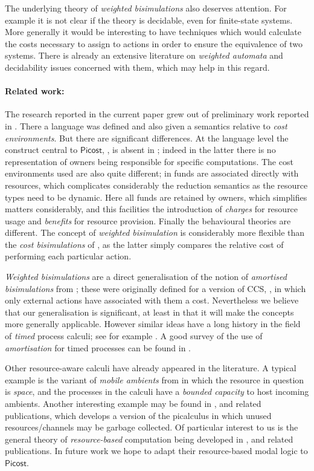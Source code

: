 \documentclass{LMCS}
\newcommand{\pfn}[1]{\mathsf{#1}}  \newcommand{\cfn}[1]{\mathsf{#1}}  \newcommand{\ownfnt}[1]{{\mathsf{#1}}}
\newcommand{\picost}{\ensuremath{\pfn{Picost}}\xspace}
\begin{document}
The underlying theory of \emph{weighted bisimulations} also deserves
attention. For example it is not clear if the theory is decidable,
even for finite-state systems. More generally it would be interesting
to have techniques which would calculate the costs necessary to assign
to actions in order to ensure the equivalence of two systems.
There is already an extensive literature on \emph{weighted automata} \cite{wa}
and  decidability issues concerned with them, which may help in this regard.

\paragraph{Related work:} The research reported in the current paper
grew out of preliminary work reported in \cite{picost}. There a
language  was defined and also given a semantics
relative to \emph{cost environments}. But there are significant
differences.  At the language level the construct central to \picost,
, is absent in ; indeed in the latter
there is no representation of owners being responsible for specific
computations.  The cost environments used are also quite different; in
 funds are associated directly with resources,
which complicates considerably the reduction semantics as the resource
types need to be dynamic.  Here all funds are retained by owners,
which simplifies matters considerably, and this facilities the
introduction of \emph{charges} for resource usage and \emph{benefits}
for resource provision. Finally the behavioural theories are
different.  The concept of \emph{weighted bisimulation} is considerably
more flexible than the \emph{cost bisimulations} of \cite{picost}, as
the latter simply compares the relative cost of performing each
particular action.


\emph{Weighted bisimulations} are a direct generalisation of the
notion of \emph{amortised bisimulations} from \cite{astrid}; these
were originally defined for a version of CCS, \cite{ccs}, in which
only external actions have associated with them a cost. Nevertheless
we believe that our generalisation is significant, at least in that it
will make the concepts more generally applicable. However similar ideas
have a long history in the field of \emph{timed} process calculi; see
for example \cite{Tofts94}. A good survey of the use of
\emph{amortisation} for timed processes can be found in \cite{speed}.

Other resource-aware calculi have already appeared in the
literature. A typical example is the variant of \emph{mobile ambients}
\cite{ambients} from \cite{vladi} in which the resource in question is
\emph{space}, and the processes in the calculi have a \emph{bounded
  capacity} to host incoming ambients.  Another interesting example
may be found in \cite{teller:tcs04}, and related publications, which
develops a version of the picalculus in which unused
resources/channels may be garbage collected.  Of particular interest
to us is the general theory of \emph{resource-based} computation being
developed in \cite{pym}, and related publications. In future work we
hope to adapt their resource-based modal logic to \picost.
\end{document}
